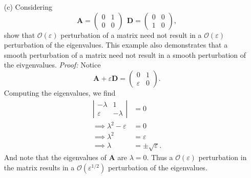 \documentclass{article}
\begin{document}
\begin{itemize}
\begin{itemize}
        \item[(c)] Considering
        \[\mathbf{A} = \begin{pmatrix}
            0 & 1\\
            0 & 0
        \end{pmatrix} \:\: \mathbf{D} = \begin{pmatrix}
            0 & 0\\
            1 & 0
        \end{pmatrix},\]
        show that $\mathcal{O}(\varepsilon)$ perturbation of a matrix need not result in a $\mathcal{O}(\varepsilon)$ perturbation of the eigenvalues. This example also demonstrates that a smooth perturbation of a matrix need not result in a smooth perturbation of the eivgenvalues.
        \newline\newline
        \textit{Proof:} Notice 
        \[\mathbf{A} + \varepsilon\mathbf{D} = \begin{pmatrix}
            0 & 1\\
            \varepsilon & 0
        \end{pmatrix}.\]
        Computing the eigenvalues, we find
        \begin{align*}
            \left|\begin{matrix}
                -\lambda & 1\\
                \varepsilon & -\lambda
            \end{matrix}\right| &= 0\\
            \implies \lambda^2 - \varepsilon &= 0\\
            \implies \lambda^2 &= \varepsilon\\
            \implies \lambda &= \pm\sqrt{\varepsilon}.
        \end{align*}
        And note that the eigenvalues of $\mathbf{A}$ are $\lambda = 0$. Thus a $\mathcal{O}(\varepsilon)$ perturbation in the matrix results in a $\mathcal{O}(\varepsilon^{1/2})$ perturbation of the eigenvalues.
    \end{itemize}

    \pagebreak
    

\end{itemize}
\end{document}
